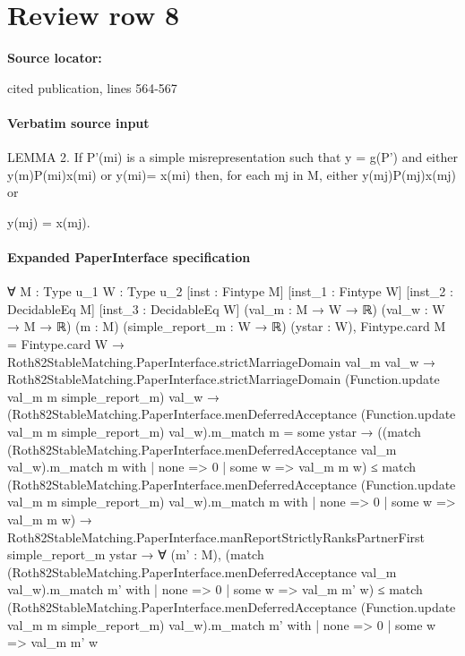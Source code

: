\documentclass[10pt]{article}
\begin{document}
\section*{Review row 8}
\textbf{Source locator:} {\footnotesize\raggedright cited publication, lines 564-\allowbreak{}567\par}
\paragraph{Verbatim source input}
\begin{ReviewVerbatim}
LEMMA 2. If P'(mi) is a simple misrepresentation such that y = g(P') and either
y(m)P(mi)x(mi) or y(mi)= x(mi) then, for each mj in M, either y(mj)P(mj)x(mj) or

y(mj) = x(mj).
\end{ReviewVerbatim}



\paragraph{Expanded PaperInterface specification}
\begin{ReviewVerbatim}
∀ {M : Type u_1} {W : Type u_2} [inst : Fintype M] [inst_1 : Fintype W] [inst_2 : DecidableEq M]
  [inst_3 : DecidableEq W] (val_m : M → W → ℝ) (val_w : W → M → ℝ) (m : M) (simple_report_m : W → ℝ) (ystar : W),
  Fintype.card M = Fintype.card W →
    Roth82StableMatching.PaperInterface.strictMarriageDomain val_m val_w →
      Roth82StableMatching.PaperInterface.strictMarriageDomain (Function.update val_m m simple_report_m) val_w →
        (Roth82StableMatching.PaperInterface.menDeferredAcceptance (Function.update val_m m simple_report_m)
                  val_w).m_match
              m =
            some ystar →
          ((match (Roth82StableMatching.PaperInterface.menDeferredAcceptance val_m val_w).m_match m with
              | none => 0
              | some w => val_m m w) ≤
              match
                (Roth82StableMatching.PaperInterface.menDeferredAcceptance (Function.update val_m m simple_report_m)
                      val_w).m_match
                  m with
              | none => 0
              | some w => val_m m w) →
            Roth82StableMatching.PaperInterface.manReportStrictlyRanksPartnerFirst simple_report_m ystar →
              ∀ (m' : M),
                (match (Roth82StableMatching.PaperInterface.menDeferredAcceptance val_m val_w).m_match m' with
                  | none => 0
                  | some w => val_m m' w) ≤
                  match
                    (Roth82StableMatching.PaperInterface.menDeferredAcceptance (Function.update val_m m simple_report_m)
                          val_w).m_match
                      m' with
                  | none => 0
                  | some w => val_m m' w
\end{ReviewVerbatim}
\end{document}
